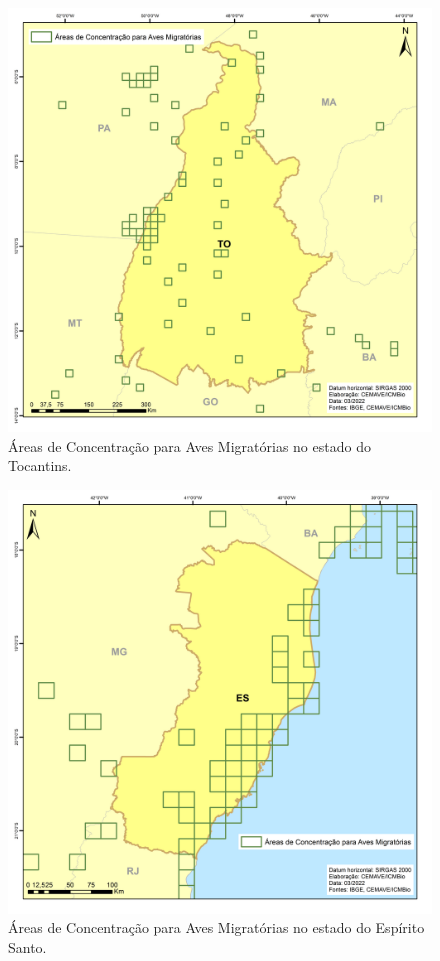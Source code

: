 \documentclass[
  oneside]{scrbook}
\begin{document}
\begin{figure}[H]

{\centering \includegraphics[width=0.75\linewidth]{imagens/cap07/Figura_7.26_TO} 

}

\caption{Áreas de Concentração para Aves Migratórias no estado do Tocantins.}\label{fig:46}
\end{figure}

\begin{figure}[H]

{\centering \includegraphics[width=0.75\linewidth]{imagens/cap07/Figura_7.27_ES} 

}

\caption{Áreas de Concentração para Aves Migratórias no estado do Espírito Santo.}\label{fig:47}
\end{figure}
\end{document}
